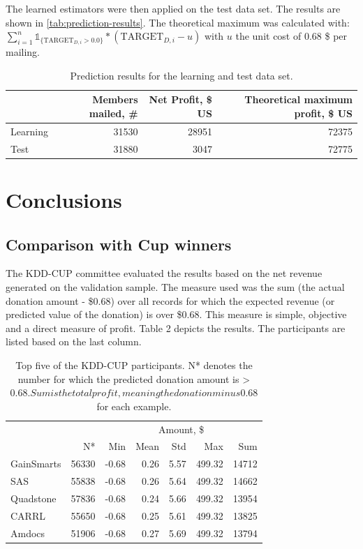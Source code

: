 \documentclass[
  11pt,
  a4paper,
  DIV=12,captions=tableheading,oneside,titlepage=firstiscover,abstracton]{scrreprt}
\begin{document}
The learned estimators were then applied on the test data set. The results are shown in \ref{tab:prediction-results}. The theoretical maximum was calculated with: \(\sum_{i=1}^n \mathbb{1}_{\{\text{TARGET}_{D,i} > 0.0\}}*(\text{TARGET}_{D,i} - u)\) with \(u\) the unit cost of 0.68 \$ per mailing.

\begin{table}[!h]

\caption{\label{tab:prediciton-results}Prediction results for the learning and test data set.}
\centering
\begin{tabular}{lrrr}
\toprule
  & Members mailed, \# & Net Profit, \$ US & Theoretical maximum profit, \$ US\\
\midrule
Learning & 31530 & 28951 & 72375\\
Test & 31880 & 3047 & 72775\\
\bottomrule
\end{tabular}
\end{table}

\hypertarget{conclusions}{%
\chapter{Conclusions}\label{conclusions}}

\hypertarget{comparison-with-cup-winners}{%
\section{Comparison with Cup winners}\label{comparison-with-cup-winners}}

The KDD-CUP committee evaluated the results based on the net revenue generated on the validation sample. The measure used was the sum (the actual donation amount - \$0.68) over all records for which the expected revenue (or predicted value of the donation) is over \$0.68. This measure is simple, objective and a direct measure of profit. Table 2 depicts the results. The participants are listed based on the last column.

\begin{table}[!h]

\caption{\label{tab:benchmark-cup-winners}Top five of the KDD-CUP participants. N* denotes the number for which the predicted donation amount is > $0.68. Sum is the total profit, meaning the donation minus $0.68 for each example.}
\centering
\begin{tabular}{lrrrrrr}
\toprule
\multicolumn{1}{c}{ } & \multicolumn{1}{c}{ } & \multicolumn{5}{c}{Amount, \$} \\
\cmidrule(l{3pt}r{3pt}){3-7}
  & N* & Min & Mean & Std & Max & Sum\\
\midrule
GainSmarts & 56330 & -0.68 & 0.26 & 5.57 & 499.32 & 14712\\
SAS & 55838 & -0.68 & 0.26 & 5.64 & 499.32 & 14662\\
Quadstone & 57836 & -0.68 & 0.24 & 5.66 & 499.32 & 13954\\
CARRL & 55650 & -0.68 & 0.25 & 5.61 & 499.32 & 13825\\
Amdocs & 51906 & -0.68 & 0.27 & 5.69 & 499.32 & 13794\\
\bottomrule
\end{tabular}
\end{table}
\end{document}
